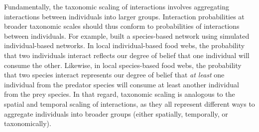 \begin{box2.4}
Fundamentally, the taxonomic scaling of interactions involves aggregating
interactions between individuals into larger groups. Interaction probabilities
at broader taxonomic scales should thus conform to probabilities of interactions
between individuals. For example, \textcite{Canard2012Emergence} built a
species-based network using simulated individual-based networks. In local
individual-based food webs, the probability that two individuals interact
reflects our degree of belief that one individual will consume the other.
Likewise, in local species-based food webs, the probability that two species
interact represents our degree of belief that \textit{at least} one individual
from the predator species will consume at least another individual from the prey
species. In that regard, taxonomic scaling is analogous to the spatial and
temporal scaling of interactions, as they all represent different ways to
aggregate individuals into broader groups (either spatially, temporally, or
taxonomically).

\end{box2.4}



